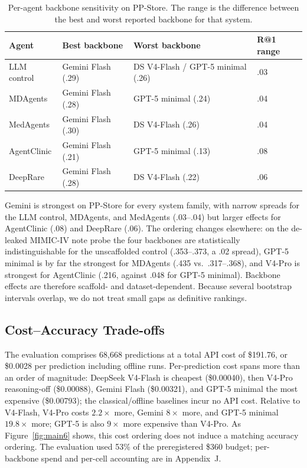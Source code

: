 \documentclass[letterpaper]{article} %
\begin{document}
\begin{table}[t]
\centering
\scriptsize
\setlength{\tabcolsep}{6pt}
\caption{Per-agent backbone sensitivity on PP-Store. The range is the difference between the best and worst reported backbone for that system.}
\label{tbl:bbsens}
\begin{tabular}{@{}llll@{}}
\toprule
Agent & Best backbone & Worst backbone & R@1 range \\
\midrule
LLM control & Gemini Flash (.29) & DS V4-Flash / GPT-5 minimal (.26) & .03 \\
MDAgents & Gemini Flash (.28) & GPT-5 minimal (.24) & .04 \\
MedAgents & Gemini Flash (.30) & DS V4-Flash (.26) & .04 \\
AgentClinic & Gemini Flash (.21) & GPT-5 minimal (.13) & .08 \\
DeepRare & Gemini Flash (.28) & DS V4-Flash (.22) & .06 \\
\bottomrule
\end{tabular}
\end{table}

Gemini is strongest on PP-Store for every system family, with narrow spreads for the LLM control, MDAgents, and MedAgents (.03--.04) but larger effects for AgentClinic (.08) and DeepRare (.06). The ordering changes elsewhere: on the de-leaked MIMIC-IV note probe the four backbones are statistically indistinguishable for the unscaffolded control (.353--.373, a .02 spread), GPT-5 minimal is by far the strongest for MDAgents (.435 vs.\ .317--.368), and V4-Pro is strongest for AgentClinic (.216, against .048 for GPT-5 minimal). Backbone effects are therefore scaffold- and dataset-dependent. Because several bootstrap intervals overlap, we do not treat small gaps as definitive rankings.


\subsection{Cost--Accuracy Trade-offs}
\label{sec-6-3}

The evaluation comprises 68,668 predictions at a total API cost of \$191.76, or \$0.0028 per prediction including offline runs. Per-prediction cost spans more than an order of magnitude: DeepSeek V4-Flash is cheapest (\$0.00040), then V4-Pro reasoning-off (\$0.00088), Gemini Flash (\$0.00321), and GPT-5 minimal the most expensive (\$0.00793); the classical/offline baselines incur no API cost. Relative to V4-Flash, V4-Pro costs $2.2\times$ more, Gemini $8\times$ more, and GPT-5 minimal $19.8\times$ more; GPT-5 is also $9\times$ more expensive than V4-Pro. As Figure~\ref{fig:main6} shows, this cost ordering does not induce a matching accuracy ordering. The evaluation used 53\% of the preregistered \$360 budget; per-backbone spend and per-cell accounting are in Appendix~J.
\end{document}
